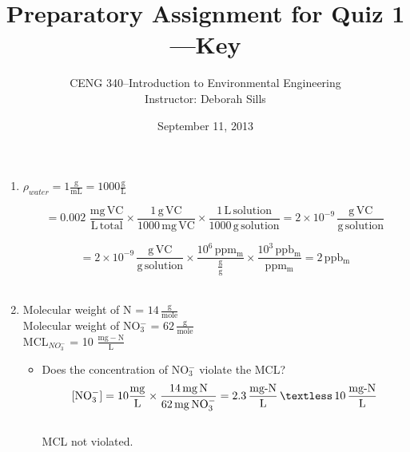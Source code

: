 \documentclass[12pt,letterpaper]{article}
\newcommand{\var}[1]{{\operatorname{#1}}}
\begin{document}
\setlength{\parindent}{0cm} 


\frenchspacing






\title {Preparatory Assignment for Quiz 1---\textbf{Key}} 
\author {CENG 340--Introduction to Environmental Engineering\\
Instructor: Deborah Sills}
\date {September 11, 2013}
\maketitle

\begin{enumerate}

\item
$\rho_{water} = 1 \mathrm{\frac{g}{mL}} = 1000 \mathrm{\frac{g}{L}}$

\begin{equation*}
[VC] = 0.002 \,\, \mathrm{\frac{mg \,VC}{L \, total}\times\frac{1 \, g\, VC}{1000\, mg\, VC}\times\frac{1\, L\, solution}{1000\,g\,solution}=2\times 10^{-9}\, \frac{g\,VC}{g\,solution}}
\end{equation*} 

\begin{equation*}
[VC] = \mathrm{2\times 10^{-9}\, \frac{g\,VC}{g\,solution}\times \frac {10^6 \, ppm_m}{\frac{g}{g}}\times \frac{10^3 \, ppb_m}{ppm_m} = 2\, ppb_m}
\end{equation*}\\

\item
Molecular weight of N = $14\, \mathrm{\frac{g}{mole}}$\\
Molecular weight of NO$_3^-$ = $62\, \mathrm{\frac{g}{mole}}$\\
MCL$_{NO_3^-}$ = 10 $\mathrm{\frac{mg-N}{L}}$

\begin{itemize}
\item Does the concentration of NO$_3^-$ violate the MCL?
\begin{equation*}
\mathrm{[NO_3^-] = 10 \frac{mg}{L}\times \frac{14\,mg\, N}{62\,mg\,NO_3^-} = 2.3 \, \frac{\var{mg-N}}{L}\, \textless \,10 \, \frac{\var{mg-N}}{L}}
\end{equation*}\\
MCL not violated.


\end{itemize}
\end{enumerate}
\end{document}
